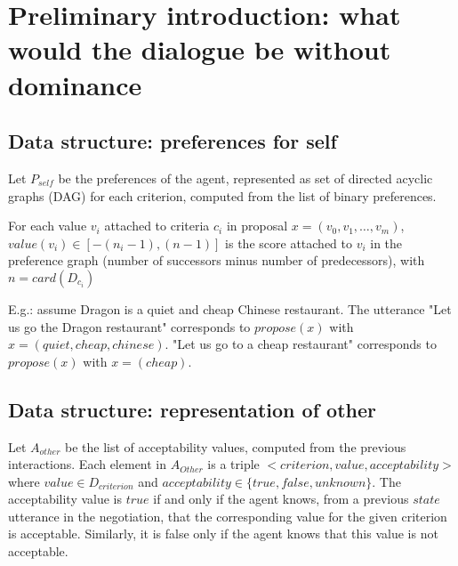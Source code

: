 \documentclass{llncs}
\begin{document}
	\title{\vskip -10pt}
	
	\author{Lydia Ould Ouali, Charles Rich \and
	Nicolas Sabouret }
	
	\maketitle 
	\begin{abstract}\vskip -20pt
	  
	\end{abstract}

\section{Preliminary introduction: what would the dialogue be without dominance}

\subsection{Data structure: preferences for self}
Let $P_{self}$ be the preferences of the agent, represented as set of directed acyclic graphs (DAG) for each criterion, computed from the list of binary preferences.

For each value $v_i$ attached to criteria $c_i$ in proposal $x=(v_0,v_1,\ldots,v_m)$, $value(v_i)\in[-(n_i-1),(n-1)]$ is the score attached to $v_i$ in the preference graph (number of successors minus number of predecessors), with $n=card(D_{c_i})$

E.g.: assume Dragon is a quiet and cheap Chinese restaurant. The utterance "Let us go the Dragon restaurant" corresponds to $propose(x)$ with $x=(quiet,cheap,chinese)$. "Let us go to a cheap restaurant" corresponds to $propose(x)$ with $x=(cheap)$.

\subsection{Data structure: representation of other}
Let $A_{other}$ be the list of acceptability values, computed from the previous interactions. Each element in $A_{Other}$ is a triple $<criterion,value,acceptability>$ where $value\in D_{criterion}$ and $acceptability\in\{true,false,unknown\}$. The acceptability value is $true$ if and only if the agent knows, from a previous $state$ utterance in the negotiation, that the corresponding value for the given criterion is acceptable. Similarly, it is false only if the agent knows that this value is not acceptable.
\end{document}

